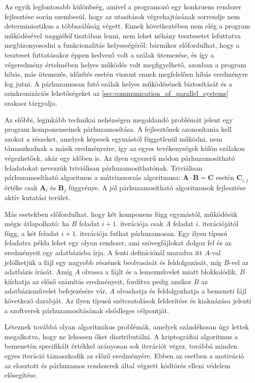     Az egyik legfontosabb különbség, amivel a programozó egy konkruens rendszer fejlesztése során szembesül, hogy az utasítások végrehajtásának sorrendje nem determinisztikus a többszálúság végett. Ennek következtében nem elég a program működésével \emph{nagyjából} tisztában lenni, nem lehet néhány tesztesetet lefuttatva megbizonyosodni a funkcionalitás helyességéről: bármikor előfordulhat, hogy a teszteset futtatásakor éppen kedvező volt a szálak ütemezése, és így a végeredmény értelmében helyes működés volt megfigyelhető, azonban a program hibás, más ütemezés, időzítés esetén viszont ennek megfelelően hibás eredményre fog jutni. A párhuzamosan futó szálak helyes működésének biztosítását és a szinkronizációs lehetőségeket az \ref{sec:communication_of_parallel_systems} szakasz tárgyalja.
    
    Az előbbi, leginkább technikai nehézségen megoldandó problémát jelent egy program komponenseinek párhuzamosítása. A fejlesztőnek azonosítania kell azokat a részeket, amelyek képesek egymástól függetlenül működni, nem támaszkodnak a másik eredményeire, így az egyes tevékenységek külön szálakon végezhetőek, akár egy időben is. Az ilyen egyszerű módon párhuzamosítható feladatokat nevezzük triviálisan párhuzamosíthatónak. Triviálisan párhuzamosítható algoritmus a mátrixszorzás algoritmusa: $\bm A \cdot \bm B = \bm C$ esetén $\bm C_{i, j}$ értéke csak $\bm A_i$ és $\bm B_j$ függvénye. A jól párhuzamosítható algoritmusok fejlesztése aktív kutatási terület.
    
    Más esetekben előfordulhat, hogy két komponens függ egymástól, működésük mégis átlapolható: ha $B$ feladat $i+1.$ iterációja csak $A$ feladat $i.$ iterációjától függ, a két feladat $i+1.$ iterációja futhat párhuzamosan. Egy ilyen típusú feladatra példa lehet egy olyan rendszer, ami szövegfájlokat dolgoz fel és az eredményeit egy adatbázisba írja. A fenti definíciónál maradva itt $A$-val jelölhetjük a fájl egy nagyobb részének beolvasását és feldolgozását, míg $B$-vel az adatbázis írását. Amíg $A$ olvassa a fájlt és a lemezművelet miatt blokkolódik, $B$ kiírhatja az előző számítás eredményeit, fordítva pedig amikor $B$ az adatbázisművelet befejezésére vár, $A$ olvashatja és feldolgozhatja a bemeneti fájl következő darabját. Az ilyen típusú szétcsatolások felderítése és kiaknázása jelenti a szoftverek párhuzamosításának elsődleges célpontját.
    
    Léteznek továbbá olyan algoritmikus problémák, amelyek szándékosan úgy lettek megalkotva, hogy ne lehessen őket disztributálni. A \cite{bcrypt} kriptográfiai algoritmus a bemenetén specifikált értékkel arányosan sok iterációt végez, továbbá minden egyes iteráció támaszkodik az előző eredményére. Ebben az esetben a motiváció az elosztott és párhuzamos rendszerek által végzett kódtörés elleni védelem elősegítése.
    
